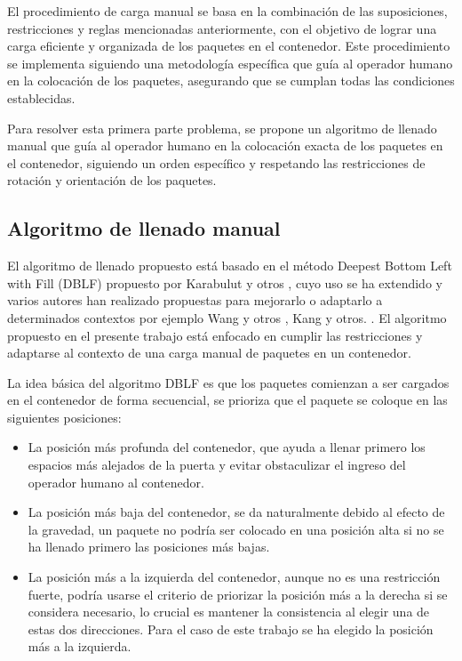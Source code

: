 El procedimiento de carga manual se basa en la combinación de las suposiciones, restricciones y reglas mencionadas anteriormente, con el objetivo de lograr una carga eficiente y organizada de los paquetes en el contenedor. Este procedimiento se implementa siguiendo una metodología específica que guía al operador humano en la colocación de los paquetes, asegurando que se cumplan todas las condiciones establecidas.

Para resolver esta primera parte problema, se propone un algoritmo de llenado manual que guía al operador humano en la colocación exacta de los paquetes en el contenedor, siguiendo un orden específico y respetando las restricciones de rotación y orientación de los paquetes.

\subsection{Algoritmo de llenado manual}

El algoritmo de llenado propuesto está basado en el método Deepest Bottom Left with Fill (DBLF) propuesto por Karabulut y otros \cite{karabulut2004hybrid}, cuyo uso se ha extendido y varios autores han realizado propuestas para mejorarlo o adaptarlo a determinados contextos por ejemplo Wang y otros \cite{wang2010hybrid}, Kang y otros. \cite{kang2012hybrid}. El algoritmo propuesto en el presente trabajo está enfocado en cumplir las restricciones y adaptarse al contexto de una carga manual de paquetes en un contenedor.

La idea básica del algoritmo DBLF es que los paquetes comienzan a ser cargados en el contenedor de forma secuencial, se prioriza que el paquete se coloque en las siguientes posiciones:

\begin{itemize}
    \item La posición más profunda del contenedor, que ayuda a llenar primero los espacios más alejados de la puerta y evitar obstaculizar el ingreso del operador humano al contenedor.
    \item La posición más baja del contenedor, se da naturalmente debido al efecto de la gravedad, un paquete no podría ser colocado en una posición alta si no se ha llenado primero las posiciones más bajas.
    \item La posición más a la izquierda del contenedor, aunque no es una restricción fuerte, podría usarse el criterio de priorizar la posición más a la derecha si se considera necesario, lo crucial es mantener la consistencia al elegir una de estas dos direcciones. Para el caso de este trabajo se ha elegido la posición más a la izquierda.
\end{itemize}

